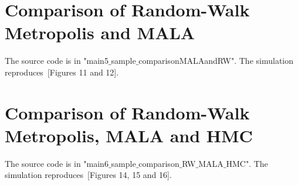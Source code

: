 \documentclass{scrartcl}
\begin{document}
\section{Comparison of Random-Walk Metropolis and MALA}

The source code is in "main5$\_$sample$\_$comparisonMALAandRW". The simulation reproduces~\cite{sanz2014markov}[Figures 11 and 12]. 

\section{Comparison of Random-Walk Metropolis, MALA and HMC}

The source code is in "main6$\_$sample$\_$comparison$\_$RW$\_$MALA$\_$HMC". The simulation reproduces~\cite{sanz2014markov}[Figures 14, 15 and 16]. 

\newpage






	
    
\end{document}
